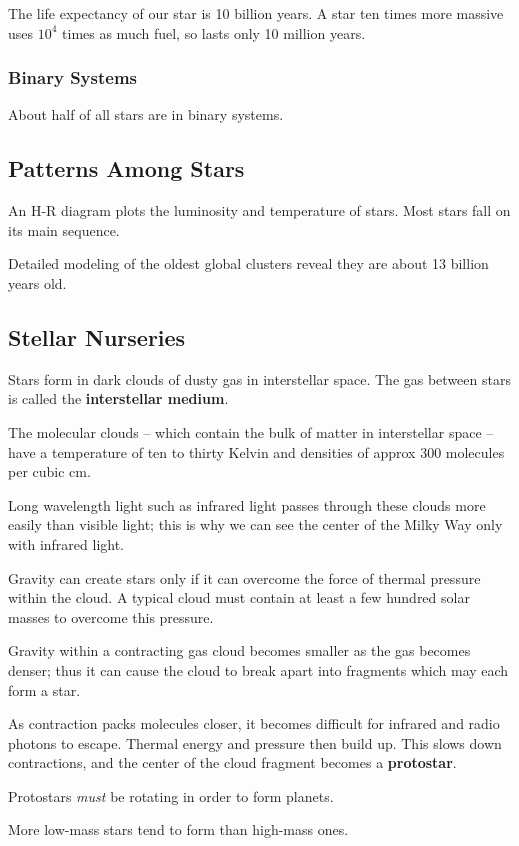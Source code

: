 The life expectancy of our star is 10 billion years. A star ten times more massive uses $10^4$ times as much fuel, so lasts only 10 million years.

\subsubsection{Binary Systems}
About half of all stars are in binary systems.

\subsection{Patterns Among Stars}
An H-R diagram plots the luminosity and temperature of stars. Most stars fall on its main sequence.

Detailed modeling of the oldest global clusters reveal they are about 13 billion years old.

\subsection{Stellar Nurseries}
Stars form in dark clouds of dusty gas in interstellar space. The gas between stars is called the {\bf interstellar medium}.

The molecular clouds -- which contain the bulk of matter in interstellar space -- have a temperature of ten to thirty Kelvin and densities of approx 300 molecules per cubic cm.

Long wavelength light such as infrared light passes through these clouds more easily than visible light; this is why we can see the center of the Milky Way only with infrared light.

Gravity can create stars only if it can overcome the force of thermal pressure within the cloud. A typical cloud must contain at least a few hundred solar masses to overcome this pressure.

Gravity within a contracting gas cloud becomes smaller as the gas becomes denser; thus it can cause the cloud to break apart into fragments which may each form a star.

As contraction packs molecules closer, it becomes difficult for infrared and radio photons to escape. Thermal energy and pressure then build up. This slows down contractions, and the center of the cloud fragment becomes a {\bf protostar}.

Protostars \emph{must} be rotating in order to form planets.

More low-mass stars tend to form than high-mass ones.
